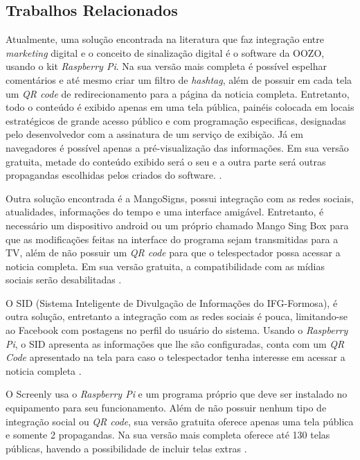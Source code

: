 \documentclass[
	12pt,				%
	openright,			%
	oneside,			%
	a4paper,			%
	english,			%
	french,				%
	spanish,			%
	brazil,				%
	]{abntex2}
\begin{document}
	\subsection*{Trabalhos Relacionados}
	Atualmente, uma solução encontrada na literatura que faz integração entre \textit{marketing} digital e o conceito de sinalização digital é o software da OOZO, usando o kit \textit{Raspberry Pi}. Na sua versão mais completa é possível espelhar comentários e até mesmo criar um filtro de \textit{hashtag}, além de possuir em cada tela um \textit{QR code} de redirecionamento para a página da noticia completa. Entretanto, todo o conteúdo é exibido apenas em uma tela pública, painéis colocada em locais estratégicos de grande acesso público e com programação especificas, designadas pelo desenvolvedor com a assinatura de um serviço de exibição. Já em navegadores é possível apenas a pré-visualização das informações. Em sua versão gratuita, metade do conteúdo exibido será o seu e a outra parte será outras propagandas escolhidas pelos criados do software. \cite{oozo2017}.
	
	Outra solução encontrada é a MangoSigns, possui integração com as redes sociais, atualidades, informações do tempo e uma interface amigável. Entretanto, é necessário um dispositivo android ou um próprio chamado Mango Sing Box para que as modificações feitas na interface do programa sejam transmitidas para a TV, além de não possuir um \textit{QR code} para que o telespectador possa acessar a noticia completa. Em sua versão gratuita, a compatibilidade com as mídias sociais serão desabilitadas \cite{mango2017}.
	
	O SID (Sistema Inteligente de Divulgação de Informações do IFG-Formosa), é outra solução, entretanto a integração com as redes sociais é pouca, limitando-se ao Facebook com postagens no perfil do usuário do sistema. Usando o \textit{Raspberry Pi}, o SID apresenta as informações que lhe são configuradas, conta com um \textit{QR Code} apresentado na tela para caso o telespectador tenha interesse em acessar a noticia completa \cite{sobrinho2017}.
	
	O Screenly usa o \textit{Raspberry Pi} e um programa próprio que deve ser instalado no equipamento para seu funcionamento. Além de não possuir nenhum tipo de integração social ou \textit{QR code}, sua versão gratuita oferece apenas uma tela pública e somente 2 propagandas. Na sua versão mais completa oferece até 130 telas públicas, havendo a possibilidade de incluir telas extras \cite{screenly2017}.
	
\end{document}
